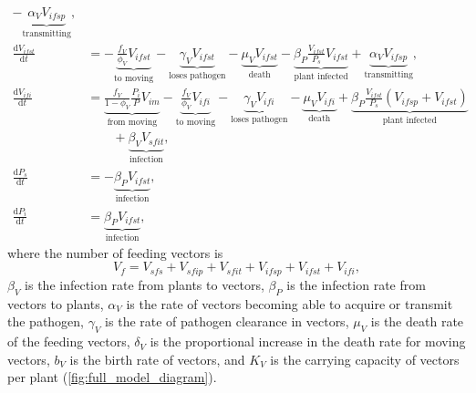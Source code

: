 \documentclass{article}
\newcommand{\md}{\mathrm{d}}
\begin{document}
\begin{equation}
\begin{split}
    - \underbrace{\alpha_V V_{ifsp}}_{\text{transmitting}},
    \\
    \frac{\md V_{ifst}}{\md t}
    &=
    - \underbrace{\frac{f_V}{\phi_V} V_{ifst}}_{\text{to moving}}
    - \underbrace{\gamma_V V_{ifst}}_{\text{loses pathogen}}
    - \underbrace{\mu_V V_{ifst}}_{\text{death}}
    - \underbrace{\beta_P \frac{V_{ifst}}{P_s} V_{ifst}}_{\text{plant infected}}
    + \underbrace{\alpha_V V_{ifsp}}_{\text{transmitting}},
    \\
    \frac{\md V_{ifi}}{\md t}
    &=
    \underbrace{\frac{f_V}{1 - \phi_V} \frac{P_i}{P} V_{im}}_{\text{from moving}}
    - \underbrace{\frac{f_V}{\phi_V} V_{ifi}}_{\text{to moving}}
    - \underbrace{\gamma_V V_{ifi}}_{\text{loses pathogen}}
    - \underbrace{\mu_V V_{ifi}}_{\text{death}}
    + \underbrace{\beta_P \frac{V_{ifst}}{P_s} (V_{ifsp} + V_{ifst})}_{\text{plant infected}}
    \\ & \quad\quad {}
    + \underbrace{\beta_V V_{sfit}}_{\text{infection}},
    \\
    \frac{\md P_s}{\md t}
    &=
    - \underbrace{\beta_P V_{ifst}}_{\text{infection}},
    \\
    \frac{\md P_i}{\md t}
    &=
    \underbrace{\beta_P V_{ifst}}_{\text{infection}},
  \end{split}
\end{equation}
where the number of feeding vectors is
\begin{equation}
  V_f = V_{sfs} + V_{sfip} + V_{sfit} + V_{ifsp} + V_{ifst} + V_{ifi},
\end{equation}
$\beta_V$ is the infection rate from plants to vectors, $\beta_P$ is
the infection rate from vectors to plants, $\alpha_V$ is the rate of
vectors becoming able to acquire or transmit the pathogen, $\gamma_V$
is the rate of pathogen clearance in vectors, $\mu_V$ is the death
rate of the feeding vectors, $\delta_V$ is the proportional increase
in the death rate for moving vectors, $b_V$ is the birth rate of
vectors, and $K_V$ is the carrying capacity of vectors per plant
(\autoref{fig:full_model_diagram}).
\end{document}
